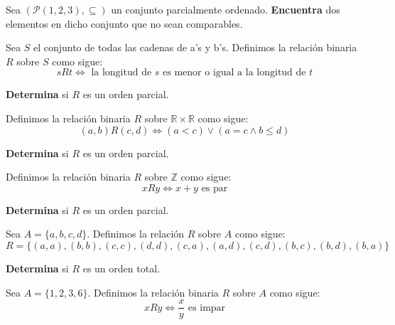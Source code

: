 \documentclass[oneside]{style}
\begin{document}
\begin{questions}[label=\protect\circled{\bfseries\arabic*}]
    \question
    {
        Sea $(\mathcal{P}(1,2,3), \subseteq)$ un conjunto parcialmente ordenado. 
        \textbf{Encuentra} dos elementos en dicho conjunto que no sean 
        comparables. 
    }


    \question
    {
        Sea $S$ el conjunto de todas las cadenas de a's y b's. Definimos la 
        relación binaria $R$ sobre $S$ como sigue:
        \begin{equation*}
            sRt \Leftrightarrow \text{ la longitud de } s \text{ es menor o 
            igual a la longitud de } t
        \end{equation*}

        \textbf{Determina} si $R$ es un orden parcial. 
    }

    \question
    {
        Definimos la relación binaria $R$ sobre $\mathbb{R} \times \mathbb{R}$ 
        como sigue:
        \begin{equation*}
            (a,b)R(c,d) \Leftrightarrow (a < c) \lor (a = c \land b \leq d)    
        \end{equation*}

        \textbf{Determina} si $R$ es un orden parcial. 
    }

    \question
    {
        Definimos la relación binaria $R$ sobre $\mathbb{Z}$ como sigue: 
        \begin{equation*}
            xRy \Leftrightarrow x+y \text{ es par}
        \end{equation*}

        \textbf{Determina} si $R$ es un orden parcial. 
    }

    \question
    {
        Sea $A = \{a,b,c,d\}$. Definimos la relación $R$ sobre $A$ como sigue:
        \begin{equation*}
            R = \{(a,a), (b,b), (c,c), (d,d), (c,a), (a,d), (c,d), (b,c), (b,d),
            (b,a)\}
        \end{equation*}

        \textbf{Determina} si $R$ es un orden total. 
    }

    \question
    {
        Sea $A = \{1,2,3,6\}$. Definimos la relación binaria $R$ sobre $A$ como 
        sigue:
        \begin{equation*}
            xRy \Leftrightarrow \frac{x}{y} \text{ es impar}
        \end{equation*}

}
\end{questions}
\end{document}
